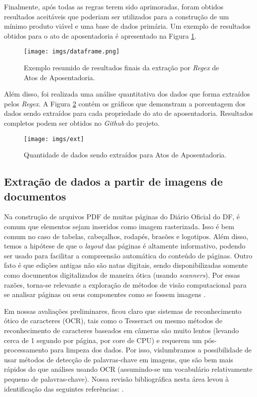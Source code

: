 \documentclass[12pt]{article}
\begin{document}
Finalmente, após todas as regras terem sido aprimoradas, foram obtidos resultados aceitáveis que poderiam ser utilizados para a construção de um mínimo produto viável e uma base de dados primária. Um exemplo de resultados obtidos para o ato de aposentadoria é apresentado na Figura \ref{dataframe}. 

\begin{figure}[ht!]
\centering
\texttt{[image: imgs/dataframe.png]}
\caption{Exemplo resumido de resultados finais da extração por \textit{Regex} de Atos de Aposentadoria.}
\label{dataframe}
\end{figure}

Além disso, foi realizada uma análise quantitativa dos dados que forma extraídos pelos \textit{Regex}. A Figura \ref{results} contém os gráficos que demonstram a porcentagem dos dados sendo extraídos para cada propriedade do ato de aposentadoria. Resultados completos podem ser obtidos no \emph{Github} do projeto.

\begin{figure}[ht!]
\centering
\texttt{[image: imgs/ext]}
\caption{Quantidade de dados sendo extraídos para Atos de Aposentadoria.}
\label{results}
\end{figure}

\clearpage
\subsection{Extração de dados a partir de imagens de documentos}

Na construção de arquivos PDF de muitas páginas do Diário Oficial do DF,
é comum que elementos sejam inseridos como imagem rasterizada. Isso é bem comum no
caso de tabelas, cabeçalhos, rodapés, brasões e logotipos. 
Além disso, temos a hipótese de que o {\em layout} das páginas
é altamente informativo, podendo ser usado para facilitar a compreensão
automática do conteúdo de páginas. Outro fato é que edições antigas não 
são natas digitais, sendo disponibilizadas somente como documentos
digitalizados de maneira ótica (usando {\em scanners}).
Por essas razões, torna-se relevante a exploração de métodos de visão 
computacional para se analisar páginas ou seus componentes como se fossem 
imagens \cite{marinai2008introduction}. 

Em nossas avaliações preliminares, ficou claro que sistemas de reconhecimento
ótico de caracteres (OCR), tais como o Tesseract \cite{smith_Tesseract_icdar2007}
ou mesmo métodos de reconhecimento de caracteres baseados em câmeras \cite{deCampos-VISAPP-2009}
são muito lentos (levando cerca de 1 segundo por página, por core de CPU) 
e requerem um pós-processamento para limpeza dos dados.
Por isso, vislumbramos a possibilidade de usar métodos de detecção de 
palavras-chave em imagens, que são bem mais rápidos do que análises usando OCR
(assumindo-se um vocabulário relativamente pequeno de palavras-chave).
Nossa revisão bibliográfica nesta área levou à identificação das seguintes referências:
\cite{epshtein2010detecting,Liu_etal_FOTS_CVPR_2018,Ye_Doermann_TextDetectionSurvey_PAMI_2015,ren2015faster}.
\end{document}
